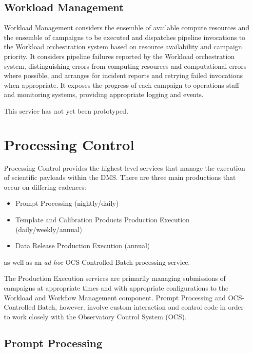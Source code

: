 \documentclass[DM,lsstdraft,toc]{lsstdoc}
\begin{document}
\subsection{Workload Management}\label{workload-management}

Workload Management considers the ensemble of available compute resources and
the ensemble of campaigns to be executed and dispatches pipeline invocations to
the Workload orchestration system based on resource availability and campaign
priority.  It considers pipeline failures reported by the Workload
orchestration system, distinguishing errors from computing resources and
computational errors where possible, and arranges for incident reports and
retrying failed invocations when appropriate.  It exposes the progress of each
campaign to operations staff and monitoring systems, providing appropriate
logging and events.

This service has not yet been prototyped.


\section{Processing Control}\label{processing-control}

Processing Control provides the highest-level services that manage the
execution of scientific payloads within the DMS.  There are three main
productions that occur on differing cadences:
\begin{itemize}
	\item Prompt Processing (nightly/daily)
	\item Template and Calibration Products Production Execution (daily/weekly/annual)
	\item Data Release Production Execution (annual)
\end{itemize}
as well as an \textit{ad hoc} OCS-Controlled Batch processing service.

The Production Execution services are primarily managing submissions of
campaigns at appropriate times and with appropriate configurations to the
Workload and Workflow Management component.  Prompt Processing and
OCS-Controlled Batch, however, involve custom interaction and control code in
order to work closely with the Observatory Control System (OCS).

\subsection{Prompt Processing}\label{prompt-processing}
\end{document}
